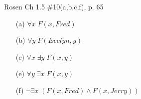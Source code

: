 \begin{questions}
 Rosen Ch 1.5 \#10(a,b,c,f), p. 65
    \ifprintanswers
        \vspace{-12pt}
    \fi
  \begin{solution}
      \begin{itemize}[itemsep=0pt,parsep=0pt,topsep=0pt,partopsep=0pt]
         \item[(a)] $\forall x\; F(x,Fred)$
         \item[(b)] $\forall y\; F(Evelyn, y)$
          \item[(c)] $\forall x\; \exists y\; F(x,y)$
         \item[(e)] $ \forall y\; \exists x\; F(x,y)$
          \item[(f)] $\neg \exists x\; (F(x, Fred) \wedge F(x,Jerry))$
      \end{itemize}
  \end{solution}




\end{questions}
